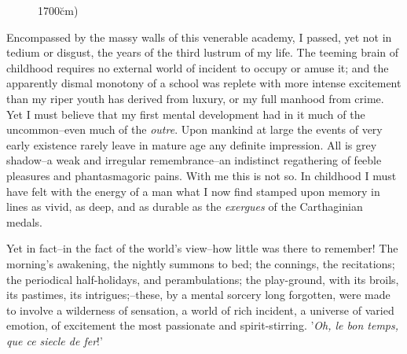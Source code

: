 \documentclass[12pt]{book}
\def\MAGIC{MAGIC}
\begin{document}
\begin{figure}[p]
{    1700\u{cm})} 
  \label{fig:Mspots}
\end{figure}

     Encompassed by the massy walls of this venerable academy, I
passed, yet not in tedium or disgust, the years of the third
lustrum of my life.  The teeming brain of childhood requires no
external world of incident to occupy or amuse it; and the
apparently dismal monotony of a school was replete with more
intense excitement than my riper youth has derived from luxury, or
my full manhood from crime.  Yet I must believe that my first
mental development had in it much of the uncommon--even much of the
\emph{outre}.  Upon mankind at large the events of very early
existence rarely leave in mature age any definite impression. 
All is grey shadow--a weak and irregular remembrance--an indistinct
regathering of feeble pleasures and phantasmagoric pains.  With me
this is not so.  In childhood I must have felt with the energy of
a man what I now find stamped upon memory in lines as vivid, as
deep, and as durable as the \emph{exergues} of the Carthaginian
medals.

     Yet in fact--in the fact of the world's view--how little was
there to remember!  The morning's awakening, the nightly summons to
bed; the connings, the recitations; the periodical half-holidays,
and perambulations; the play-ground, with its broils, its pastimes,
its intrigues;--these, by a mental sorcery long forgotten, were
made to involve a wilderness of sensation, a world of rich
incident, a universe of varied emotion, of excitement the most
passionate and spirit-stirring.  '\emph{Oh, le bon temps, que ce
siecle de fer}!'
\end{document}
